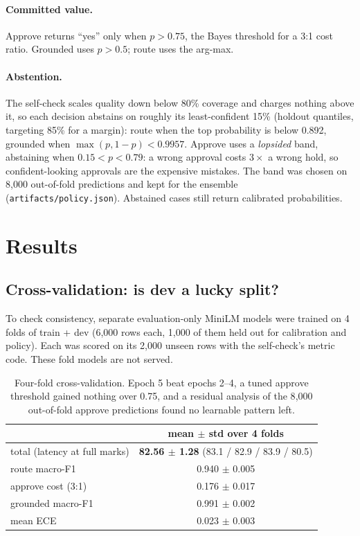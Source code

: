 \documentclass[11pt,a4paper]{article}
\begin{document}
\paragraph{Committed value.} Approve returns ``yes'' only when $p>0.75$, the
Bayes threshold for a 3:1 cost ratio. Grounded uses $p>0.5$; route uses the arg-max.

\paragraph{Abstention.} The self-check scales quality down below 80\% coverage
and charges nothing above it, so each decision abstains on roughly its
least-confident 15\% (holdout quantiles, targeting 85\% for a margin): route
when the top probability is below 0.892, grounded when $\max(p,1-p)<0.9957$.
Approve uses a \emph{lopsided} band, abstaining when $0.15<p<0.79$: a wrong
approval costs $3\times$ a wrong hold, so confident-looking approvals are the
expensive mistakes. The band was chosen on 8{,}000 out-of-fold predictions and
kept for the ensemble (\texttt{artifacts/policy.json}).
Abstained cases still return calibrated probabilities.

\section{Results}
\subsection{Cross-validation: is dev a lucky split?}\label{sec:cv}

To check consistency, separate evaluation-only MiniLM models were trained on 4 folds
of train + dev (6{,}000 rows each, 1{,}000 of them held out for calibration and
policy). Each was scored on its 2{,}000 unseen rows with the self-check's metric
code. These fold models are not served.

\begin{table}[h]
\centering
\begin{tabular}{lc}
\toprule
 & mean $\pm$ std over 4 folds \\
\midrule
total (latency at full marks) & \textbf{82.56 $\pm$ 1.28} (83.1 / 82.9 / 83.9 / 80.5) \\
route macro-F1 & 0.940 $\pm$ 0.005 \\
approve cost (3:1) & 0.176 $\pm$ 0.017 \\
grounded macro-F1 & 0.991 $\pm$ 0.002 \\
mean ECE & 0.023 $\pm$ 0.003 \\
\bottomrule
\end{tabular}
\caption{Four-fold cross-validation. Epoch 5 beat epochs 2--4, a tuned approve
threshold gained nothing over 0.75, and a residual analysis of the 8{,}000
out-of-fold approve predictions found no learnable pattern left.}
\end{table}
\end{document}

